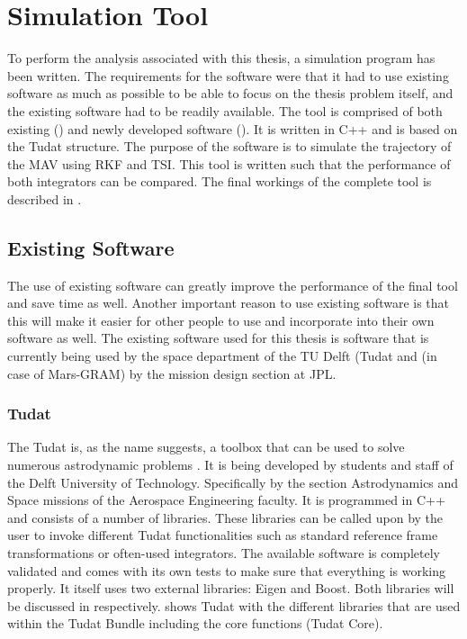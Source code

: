 \chapter{Simulation Tool} 

\label{ch:programSimulationTool}
To perform the analysis associated with this thesis, a simulation program has been written. The requirements for the software were that it had to use existing software as much as possible to be able to focus on the thesis problem itself, and the existing software had to be readily available. The tool is comprised of both existing () and newly developed software (). It is written in C++ and is based on the \ac{Tudat} structure. The purpose of the software is to simulate the trajectory of the \ac{MAV} using \ac{RKF} and \ac{TSI}. This tool is written such that the performance of both integrators can be compared. The final workings of the complete tool is described in .

\section{Existing Software}
\label{sec:existingsoftware}
The use of existing software can greatly improve the performance of the final tool and save time as well. Another important reason to use existing software is that this will make it easier for other people to use and incorporate into their own software as well. The existing software used for this thesis is software that is currently being used by the space department of the TU Delft (\ac{Tudat} and (in case of Mars-\ac{GRAM}) by the mission design section at \ac{JPL}. 


\subsection{\ac{Tudat}}
\label{subsec:tudat}
The \acf{Tudat} is, as the name suggests, a toolbox that can be used to solve numerous astrodynamic problems \citep{dirkx2016tudat}. It is being developed by students and staff of the Delft University of Technology. Specifically by the section Astrodynamics and Space missions of the Aerospace Engineering faculty. It is programmed in C++ and consists of a number of libraries. These libraries can be called upon by the user to invoke different \ac{Tudat} functionalities such as standard reference frame transformations or often-used integrators. The available software is completely validated and comes with its own tests to make sure that everything is working properly. It itself uses two external libraries: Eigen and Boost. Both libraries will be discussed in  respectively.  shows \ac{Tudat} with the different libraries that are used within the \ac{Tudat} Bundle including the core functions (\ac{Tudat} Core).

